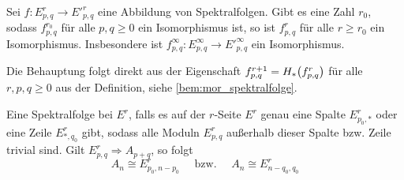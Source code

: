 \begin{satz}[{name={Abbildungslemma}},label=abb.lemma]
	Sei $f \colon E^r_{p,q} \to {E'}^r_{p,q}$ eine Abbildung von Spektralfolgen. 
	Gibt es eine Zahl $r_0$, sodass $f^{r_0}_{p,q}$ für alle $p,q \ge 0$ ein Isomorphismus ist, so ist $f^r_{p,q}$ für alle $r\ge r_0$ ein Isomorphismus.
	Insbesondere ist $f^\infty_{p,q} \colon E^\infty_{p,q} \to {E'}^\infty_{p,q}$ ein Isomorphismus.
\end{satz}
\begin{beweis}
	Die Behauptung folgt direkt aus der Eigenschaft $f^{r+1}_{p,q} = H_* \enbrace*{f^r_{p,q}}$ für alle $r,p,q\ge 0$ aus der Definition, siehe \autoref{bem:mor_spektralfolge}.
\end{beweis}

\begin{bemerkung}[{name=[kollabierende Spektralfolge]},label=bem:kollabierende_spektralfolge]
	Eine Spektralfolge  bei $E^r$, falls es auf der $r$-Seite $E^r$ genau eine Spalte $E^r_{p_0,*}$ oder eine Zeile $E^r_{*,q_0}$ gibt, sodass alle Moduln $E^r_{p,q}$ außerhalb dieser Spalte bzw. Zeile trivial sind.
	Gilt $E^r_{p,q}\Rightarrow A_{p+q}$, so folgt 
	\[
		A_n \cong E^r_{p_0,n-p_0} \quad \text{ bzw. } \quad A_n \cong E^r_{n-q_0,q_0}
	\]
\end{bemerkung}

